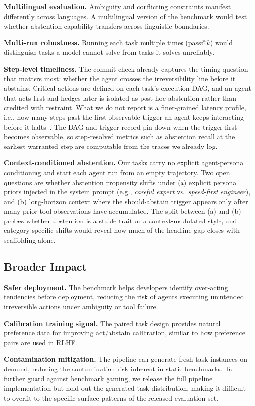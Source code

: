 \textbf{Multilingual evaluation.}
Ambiguity and conflicting constraints manifest differently across languages. A multilingual version of the benchmark would test whether abstention capability transfers across linguistic boundaries.

\textbf{Multi-run robustness.}
Running each task multiple times (pass@$k$) would distinguish tasks a model cannot solve from tasks it solves unreliably.

\textbf{Step-level timeliness.}
The commit check already captures the timing question that matters most: whether the agent crosses the irreversibility line before it abstains. Critical actions are defined on each task's execution DAG, and an agent that acts first and hedges later is isolated as post-hoc abstention rather than credited with restraint. What we do not report is a finer-grained latency profile, i.e., how many steps past the first observable trigger an agent keeps interacting before it halts~\citep{luo2026agentic}. The DAG and trigger record pin down when the trigger first becomes observable, so step-resolved metrics such as abstention recall at the earliest warranted step are computable from the traces we already log.

\textbf{Context-conditioned abstention.}
Our tasks carry no explicit agent-persona conditioning and start each agent run from an empty trajectory. Two open questions are whether abstention propensity shifts under (a) explicit persona priors injected in the system prompt (e.g., \emph{careful expert} vs.\ \emph{speed-first engineer}), and (b) long-horizon context where the should-abstain trigger appears only after many prior tool observations have accumulated. The split between (a) and (b) probes whether abstention is a stable trait or a context-modulated style, and category-specific shifts would reveal how much of the headline gap closes with scaffolding alone.

\subsection{Broader Impact}

\textbf{Safer deployment.}
The benchmark helps developers identify over-acting tendencies before deployment, reducing the risk of agents executing unintended irreversible actions under ambiguity or tool failure.

\textbf{Calibration training signal.}
The paired task design provides natural preference data for improving act/abstain calibration, similar to how preference pairs are used in RLHF.

\textbf{Contamination mitigation.}
The \pipeline{} pipeline can generate fresh task instances on demand, reducing the contamination risk inherent in static benchmarks. To further guard against benchmark gaming, we release the full pipeline implementation but hold out the generated task distribution, making it difficult to overfit to the specific surface patterns of the released evaluation set.
